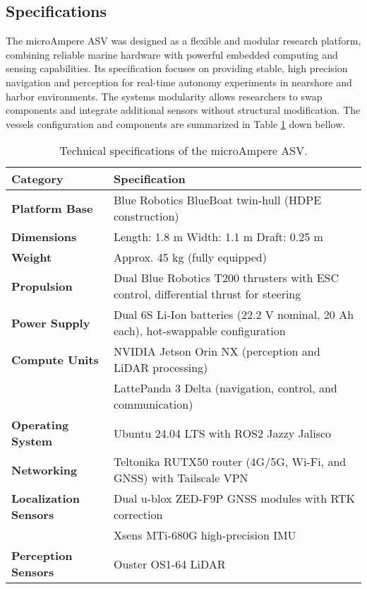 \subsection{Specifications}
The microAmpere ASV was designed as a flexible and modular research platform, combining reliable marine hardware with powerful embedded computing and sensing capabilities. Its specification focuses on providing stable, high precision navigation and perception for real-time autonomy experiments in nearshore and harbor environments. The systems modularity allows researchers to swap components and integrate additional sensors without structural modification. The vessels configuration and components are summarized in Table \ref{tab:microampere_specs} down bellow.
\begin{table}[H]
    \centering
    \caption{Technical specifications of the microAmpere ASV.}
    \label{tab:microampere_specs}
    \begin{tabular}{|p{4cm}|p{9cm}|}
        \hline
        \textbf{Category} & \textbf{Specification} \\ \hline
        \textbf{Platform Base} & Blue Robotics BlueBoat twin-hull (HDPE construction) \\ \hline
        \textbf{Dimensions} & Length: 1.8 m \quad Width: 1.1 m \quad Draft: 0.25 m \\ \hline
        \textbf{Weight} & Approx. 45 kg (fully equipped) \\ \hline
        \textbf{Propulsion} & Dual Blue Robotics T200 thrusters with ESC control, differential thrust for steering \\ \hline
        \textbf{Power Supply} & Dual 6S Li-Ion batteries (22.2 V nominal, 20 Ah each), hot-swappable configuration \\ \hline
        \textbf{Compute Units} & NVIDIA Jetson Orin NX (perception and LiDAR processing) \\ 
        & LattePanda 3 Delta (navigation, control, and communication) \\ \hline
        \textbf{Operating System} & Ubuntu 24.04 LTS with ROS2 Jazzy Jalisco \\ \hline
        \textbf{Networking} & Teltonika RUTX50 router (4G/5G, Wi-Fi, and GNSS) with Tailscale VPN \\ \hline
        \textbf{Localization Sensors} & Dual u-blox ZED-F9P GNSS modules with RTK correction \\ 
        & Xsens MTi-680G high-precision IMU \\ \hline
        \textbf{Perception Sensors} & Ouster OS1-64 LiDAR \\ 

\end{tabular}
\end{table}
